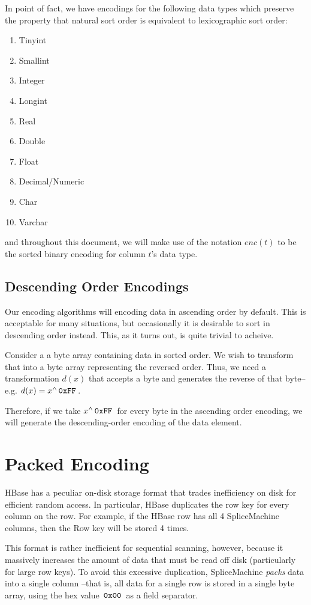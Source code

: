 In point of fact, we have encodings for the following data types which preserve the property that natural sort order is equivalent to lexicographic sort order:

\begin{enumerate}
\item Tinyint
\item Smallint
\item Integer
\item Longint
\item Real
\item Double
\item Float
\item Decimal/Numeric
\item Char
\item Varchar
\end{enumerate}

and throughout this document, we will make use of the notation $enc(t)$ to be the sorted binary encoding for column $t$'s data type.

\subsection{Descending Order Encodings}
Our encoding algorithms will encoding data in ascending order by default. This is acceptable for many situations, but occasionally it is desirable to sort in descending order instead. This, as it turns out, is quite trivial to acheive.

Consider a a byte array containing data in sorted order. We wish to transform that into a byte array representing the reversed order. Thus, we need a transformation $d(x)$ that accepts a byte and generates the reverse of that byte--e.g. $d(x) = x^\wedge{}\,\texttt{0xFF}\,$.

Therefore, if we take $x^\wedge{}\,\texttt{0xFF}\,$ for every byte in the ascending order encoding, we will generate the descending-order encoding of the data element.

\section{Packed Encoding}
HBase has a peculiar on-disk storage format that trades inefficiency on disk for efficient random access. In particular, HBase duplicates the row key for every column on the row. For example, if the HBase row has all 4 SpliceMachine columns, then the Row key will be stored 4 times. 

This format is rather inefficient for sequential scanning, however, because it massively increases the amount of data that must be read off disk (particularly for large row keys). To avoid this excessive duplication, SpliceMachine \emph{packs} data into a single column --that is, all data for a single row is stored in a single byte array, using the hex value $\,\texttt{0x00}\,$ as a field separator.

